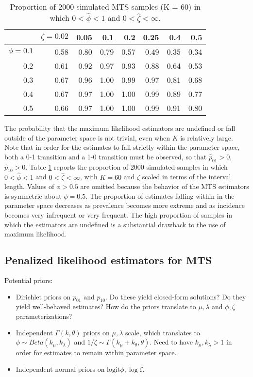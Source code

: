 \documentclass[man, noextraspace, floatsintext]{apa6}\usepackage[]{graphicx}\usepackage[]{color}
\newcommand{\logit}{\text{logit}}
\begin{document}
\begin{table}[b]
\centering
\caption{Proportion of 2000 simulated MTS samples (K = 60) in which $0 < \hat\phi < 1$ and $0 < \hat\zeta < \infty$.} 
\label{tab:MTS_zeta_valid}
\begin{tabular}{rrrrrrrr}
  \hline
 & $\zeta = 0.02$ & 0.05 & 0.1 & 0.2 & 0.25 & 0.4 & 0.5 \\ 
  \hline
$\phi = 0.1$ & 0.58 & 0.80 & 0.79 & 0.57 & 0.49 & 0.35 & 0.34 \\ 
  0.2 & 0.61 & 0.92 & 0.97 & 0.93 & 0.88 & 0.64 & 0.53 \\ 
  0.3 & 0.67 & 0.96 & 1.00 & 0.99 & 0.97 & 0.81 & 0.68 \\ 
  0.4 & 0.67 & 0.97 & 1.00 & 1.00 & 0.99 & 0.89 & 0.77 \\ 
  0.5 & 0.66 & 0.97 & 1.00 & 1.00 & 0.99 & 0.91 & 0.80 \\ 
   \hline
\end{tabular}
\end{table}


The probability that the maximum likelihood estimators are undefined or fall outside of the parameter space is not trivial, even when $K$ is relatively large. Note that in order for the estimates to fall strictly within the parameter space, both a 0-1 transition and a 1-0 transition must be observed, so that $\hat{p}_{01} > 0$, $\hat{p}_{10} > 0$. Table \ref{tab:MTS_zeta_valid} reports the proportion of 2000 simulated samples in which $0 < \hat\phi < 1$ and $0 < \hat\zeta < \infty$, with $K = 60$ and $\zeta$ scaled in terms of the interval length. Values of $\phi > 0.5$ are omitted because the behavior of the MTS estimators is symmetric about $\phi = 0.5$. The proportion of estimates falling within in the parameter space decreases as prevalence becomes more extreme and as incidence becomes very infrequent or very frequent. The high proportion of samples in which the estimators are undefined is a substantial drawback to the use of maximum likelihood.

\subsection{Penalized likelihood estimators for MTS}

Potential priors:
\begin{itemize}
\item Dirichlet priors on $p_{01}$ and $p_{10}$. Do these yield closed-form solutions? Do they yield well-behaved estimates? How do the priors translate to $\mu,\lambda$ and $\phi,\zeta$ parameterizations? 
\item Independent $\Gamma(k, \theta)$ priors on $\mu,\lambda$ scale, which translates to $\phi \sim Beta(k_\mu, k_\lambda)$ and $1 / \zeta \sim \Gamma(k_\mu + k_\theta, \theta)$. Need to have $k_\mu, k_\lambda > 1$ in order for estimates to remain within parameter space. 
\item Independent normal priors on $\logit \phi, \log \zeta$.
\end{itemize}
\end{document}
